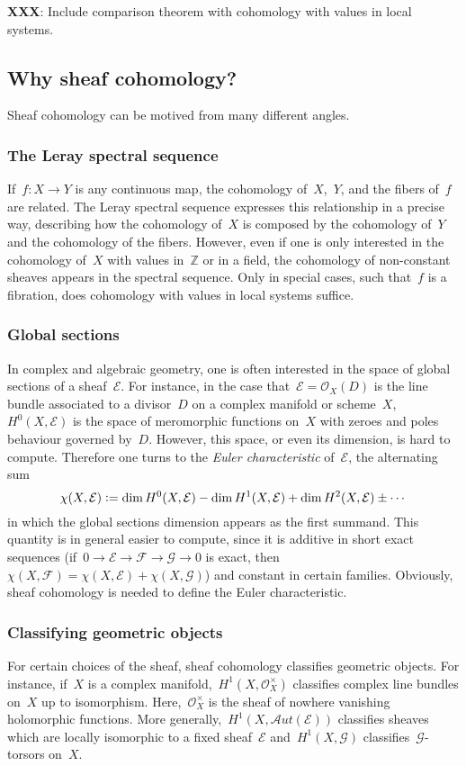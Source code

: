 \documentclass[10pt]{amsart}
\theoremstyle{definition}
\theoremstyle{plain}
\theoremstyle{remark}
\newcommand{\E}{\mathcal{E}}
\newcommand{\F}{\mathcal{F}}
\newcommand{\G}{\mathcal{G}}
\renewcommand{\O}{\mathcal{O}}
\newcommand{\Z}{\mathbb{Z}}
\newcommand{\defeq}{\vcentcolon=}
\begin{document}
\textbf{XXX}: Include comparison theorem with cohomology with values in local
systems.


\subsection{Why sheaf cohomology?}

Sheaf cohomology can be motived from many different angles.

\subsubsection*{The Leray spectral sequence} If~$f : X \to Y$ is any continuous map,
the cohomology of~$X$,~$Y$, and the fibers of~$f$ are related. The
Leray spectral sequence expresses this relationship in a precise way,
describing how the cohomology of~$X$ is composed by the cohomology of~$Y$ and
the cohomology of the fibers. However, even if one is only interested in the
cohomology of~$X$ with values in~$\Z$ or in a field, the cohomology of
non-constant sheaves appears in the spectral sequence. Only in special cases,
such that~$f$ is a fibration, does cohomology with values in local systems suffice.

\subsubsection*{Global sections} In complex and algebraic geometry, one is often
interested in the space of global sections of a sheaf~$\E$. For instance, in
the case that~$\E = \O_X(D)$ is the line bundle associated to a divisor~$D$ on a
complex manifold or scheme~$X$, $H^0(X,\E)$ is the space of meromorphic
functions on~$X$ with zeroes and poles behaviour governed by~$D$. However, this
space, or even its dimension, is hard to compute. Therefore one turns to the
\emph{Euler characteristic} of~$\E$, the alternating sum
\[ \chi(X,\E) \defeq \dim H^0(X,\E) - \dim H^1(X,\E) + \dim H^2(X,\E) \pm
\cdots \]
in which the global sections dimension appears as the first summand. This
quantity is in general easier to compute, since it is additive in short exact
sequences (if~$0 \to \E \to \F \to \G \to 0$ is exact, then~$\chi(X,\F) =
\chi(X,\E) + \chi(X,\G)$) and constant in certain families. Obviously,
sheaf cohomology is needed to define the Euler characteristic.

\subsubsection*{Classifying geometric objects} For certain choices of the sheaf, sheaf
cohomology classifies geometric objects. For instance, if~$X$ is a complex
manifold,~$H^1(X,\O_X^\times)$ classifies complex line bundles on~$X$ up to
isomorphism. Here,~$\O_X^\times$ is the sheaf of nowhere vanishing holomorphic
functions. More generally,~$H^1(X,\mathcal{A}ut(\E))$ classifies sheaves which
are locally isomorphic to a fixed sheaf~$\E$ and~$H^1(X,\G)$
classifies~$\G$-torsors on~$X$.
\end{document}
